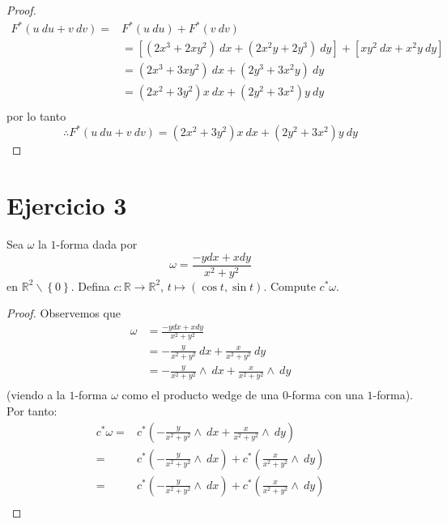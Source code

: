\documentclass[12pt]{report}
\theoremstyle{largebreak}
\newcommand\cf[3]{\ensuremath{#1:#2\rightarrow#3}}
\begin{document}
\begin{proof}
\begin{equation*}
            \begin{split}
                F^*(u\:du+v\:dv)=&F^*(u\:du)+F^*(v\:dv)\\
                &=\left[(2x^3+2xy^2)\:dx+(2x^2y+2y^3)\:dy\right]+\left[xy^2\:dx+x^2y\: dy\right]\\
                &=(2x^3+3xy^2)\:dx+(2y^3+3x^2y)\:dy\\
                &=(2x^2+3y^2)x\:dx+(2y^2+3x^2)y\:dy\\
            \end{split}
        \end{equation*}
        por lo tanto
        \begin{equation*}
            \therefore F^*(u\:du+v\:dv)=(2x^2+3y^2)x\:dx+(2y^2+3x^2)y\:dy
        \end{equation*}
    \end{proof}

    \newpage

    \section{Ejercicio 3}

    \begin{excer}
        Sea $\omega$ la $1$-forma dada por
        \begin{equation*}
            \omega = \frac{-ydx+xdy}{x^2+y^2}
        \end{equation*}
        en $\mathbb{R}^2\backslash\left\{0\right\}$. Defina $\cf{c}{\mathbb{R}}{\mathbb{R}^2}$, $t\mapsto (\cos t,\sin t)$. Compute $c^*\omega$.
    \end{excer}

    \begin{proof}
        Observemos que
        \begin{equation*}
            \begin{split}
                \omega&=\frac{-ydx+xdy}{x^2+y^2}\\
                &=-\frac{y}{x^2+y^2}\:dx+\frac{x}{x^2+y^2}\:dy\\
                &=-\frac{y}{x^2+y^2}\wedge\:dx+\frac{x}{x^2+y^2}\wedge\:dy\\
            \end{split}
        \end{equation*}
        (viendo a la $1$-forma $\omega$ como el producto wedge de una $0$-forma con una $1$-forma). Por tanto:
        \begin{equation*}
            \begin{split}
                c^*\omega=&c^*\left(-\frac{y}{x^2+y^2}\wedge\:dx+\frac{x}{x^2+y^2}\wedge\:dy\right) \\
                =&c^*\left(-\frac{y}{x^2+y^2}\wedge\:dx\right)+c^*\left(\frac{x}{x^2+y^2}\wedge\:dy\right) \\
                =&c^*\left(-\frac{y}{x^2+y^2}\wedge\:dx\right)+c^*\left(\frac{x}{x^2+y^2}\wedge\:dy\right) \\
            \end{split}
        \end{equation*}
    \end{proof}
\end{document}
